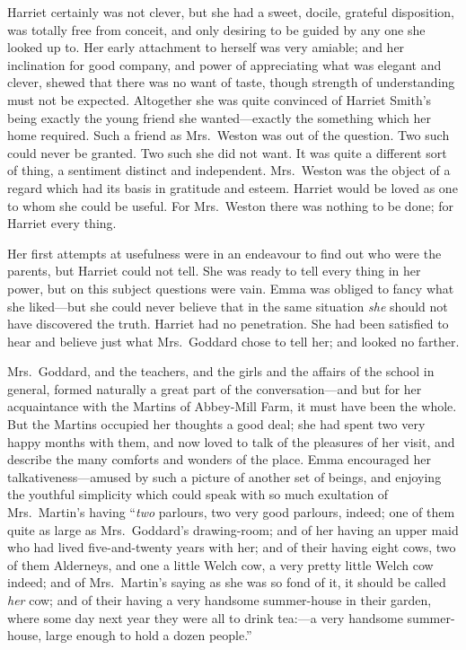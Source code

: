 Harriet certainly was not clever, but she had a sweet, docile,
grateful disposition, was totally free from conceit, and only desiring
to be guided by any one she looked up to.  Her early attachment
to herself was very amiable; and her inclination for good company,
and power of appreciating what was elegant and clever, shewed that
there was no want of taste, though strength of understanding must
not be expected.  Altogether she was quite convinced of Harriet
Smith's being exactly the young friend she wanted---exactly the
something which her home required.  Such a friend as Mrs.\ Weston
was out of the question.  Two such could never be granted.
Two such she did not want.  It was quite a different sort of thing,
a sentiment distinct and independent.  Mrs.\ Weston was the object
of a regard which had its basis in gratitude and esteem.
Harriet would be loved as one to whom she could be useful.
For Mrs.\ Weston there was nothing to be done; for Harriet every thing.

Her first attempts at usefulness were in an endeavour to find out who
were the parents, but Harriet could not tell.  She was ready to tell
every thing in her power, but on this subject questions were vain.
Emma was obliged to fancy what she liked---but she could never
believe that in the same situation \emph{she} should not have discovered
the truth.  Harriet had no penetration.  She had been satisfied
to hear and believe just what Mrs.\ Goddard chose to tell her;
and looked no farther.

Mrs.\ Goddard, and the teachers, and the girls and the affairs of the
school in general, formed naturally a great part of the conversation---and
but for her acquaintance with the Martins of Abbey-Mill Farm,
it must have been the whole.  But the Martins occupied her thoughts
a good deal; she had spent two very happy months with them,
and now loved to talk of the pleasures of her visit, and describe
the many comforts and wonders of the place.  Emma encouraged her
talkativeness---amused by such a picture of another set of beings,
and enjoying the youthful simplicity which could speak with so much
exultation of Mrs.\ Martin's having ``\emph{two} parlours, two very good parlours,
indeed; one of them quite as large as Mrs.\ Goddard's drawing-room;
and of her having an upper maid who had lived five-and-twenty years
with her; and of their having eight cows, two of them Alderneys,
and one a little Welch cow, a very pretty little Welch cow indeed;
and of Mrs.\ Martin's saying as she was so fond of it, it should be
called \emph{her} cow; and of their having a very handsome summer-house
in their garden, where some day next year they were all to drink
tea:---a very handsome summer-house, large enough to hold a dozen people.''

